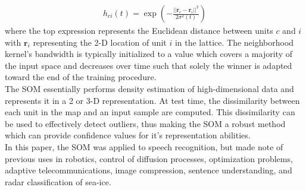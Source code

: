 \documentclass[]{article}
\begin{document}
	\begin{align*}
		 h_{ci}(t) = \exp{\left( -\frac{||\bm{r}_{c} - \bm{r}_i ||^{2}}{2 \sigma^{2}(t)} \right)}
	\end{align*}
	\noindent
	where the top expression represents the Euclidean distance between units $c$ and $i$ with $\bm{r}_{i}$ representing the 2-D location of unit $i$ in the lattice.  The neighborhood kernel's bandwidth is typically initialized to a value which covers a majority of the input space and decreases over time such that solely the winner is adapted toward the end of the training procedure. \\
	
	\noindent
	The SOM essentially performs density estimation of high-dimensional data and represents it in a 2 or 3-D representation.  At test time, the dissimilarity between each unit in the map and an input sample are computed.  This dissimilarity can be used to effectively detect outliers, thus making the SOM a robust method which can provide confidence values for it's representation abilities. \\
	
	In this paper, the SOM was applied to speech recognition, but made note of previous uses in robotics, control of diffusion processes, optimization problems, adaptive telecommunications, image compression, sentence understanding, and radar classification of sea-ice. \\
	
 	
 
\end{document}
